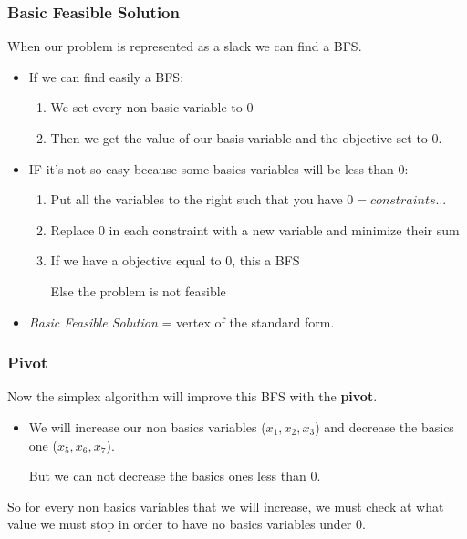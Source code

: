\subsubsection{Basic Feasible Solution}
When our problem is represented as a slack we can find a BFS. 
\begin{itemize}
    \item If we can find easily a BFS:
        \begin{enumerate}
        \item We set every non basic variable to 0
        \item Then we get the value of our basis variable and 
            the objective set to 0. 
    \end{enumerate}

\item IF it's not so easy because some basics variables will be less
    than 0:
        \begin{enumerate}
        \item Put all the variables to the right such that you have
            $0 = constraints ...$
        \item Replace 0 in each constraint with a new variable
            and minimize their sum
        \item If we have a objective equal to 0, this a BFS

            Else the problem is not feasible
    \end{enumerate}

\item \textit{Basic Feasible Solution} = vertex of the standard form.

\end{itemize}

\subsubsection{Pivot}
Now the simplex algorithm will improve this BFS with the
\textbf{pivot}. 
\begin{itemize}
    \item We will increase our non
        basics variables ($x_1, x_2, x_3$) and decrease the basics one
        ($x_5, x_6, x_7$).
    \item[But] we can not decrease
        the basics ones less than 0. 
\end{itemize}

So for every non basics variables that we
will increase, we must check at what value we must stop in order to have
no basics variables under 0.


